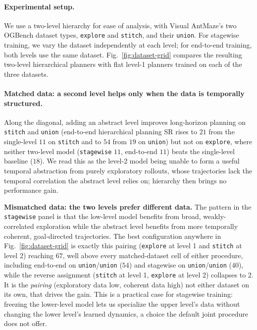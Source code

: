 \paragraph{Experimental setup.} We use a two-level hierarchy for ease of analysis,
with Visual AntMaze's two OGBench dataset types, \texttt{explore} and
\texttt{stitch}, and their \texttt{union}. For stagewise training, we vary the
dataset independently at each level; for end-to-end training, both
levels use the same dataset. Fig.~\ref{fig:dataset-grid} compares the
resulting two-level hierarchical planners with flat level-1 planners trained
on each of the three datasets.

\paragraph{Matched data: a second level helps only when the data is temporally
structured.} Along the diagonal, adding an abstract level improves long-horizon
planning on \texttt{stitch} and \texttt{union} (end-to-end hierarchical planning SR
rises to $21$ from the single-level $11$ on \texttt{stitch} and to $54$ from $19$ on
\texttt{union}) but not on \texttt{explore}, where neither two-level model
(\texttt{stagewise} $11$, end-to-end $11$) beats the single-level baseline ($18$).
We read this as the level-2 model being unable to form a useful temporal
abstraction from purely exploratory rollouts, whose trajectories lack the temporal
correlation the abstract level relies on; hierarchy then brings no performance gain.

\textbf{Mismatched data: the two levels prefer different data.} The pattern in the
\texttt{stagewise} panel is that the low-level model benefits from broad,
weakly-correlated exploration while the abstract level benefits from more
temporally coherent, goal-directed trajectories. The best configuration anywhere in
Fig.~\ref{fig:dataset-grid} is exactly this pairing (\texttt{explore} at
level 1 and \texttt{stitch} at level 2) reaching $67$, well above every
matched-dataset cell of either procedure, including end-to-end on
\texttt{union}/\texttt{union} ($54$) and stagewise on \texttt{union}/\texttt{union}
($40$), while the reverse assignment (\texttt{stitch} at level 1, \texttt{explore}
at level 2) collapses to $2$. It is the \emph{pairing} (exploratory data low,
coherent data high) not either dataset on its own, that drives the gain. This is
a practical case for stagewise training: freezing the lower-level model lets us
specialize the upper level's data without changing the lower level's learned
dynamics, a choice the default joint procedure does not offer.

